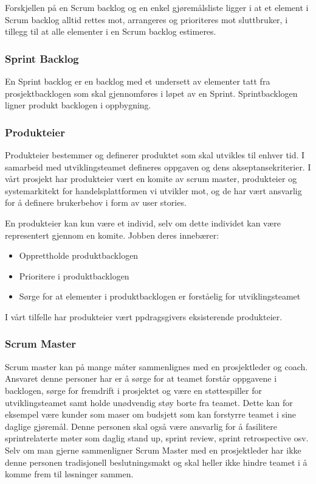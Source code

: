 Forskjellen på en Scrum backlog og en enkel gjøremålsliste ligger i at et element i Scrum backlog alltid rettes mot, arrangeres og prioriteres mot sluttbruker, i tillegg til at alle elementer i en Scrum backlog estimeres. 


\subsubsection{\textbf{Sprint Backlog}}
En Sprint backlog er en backlog med et undersett av elementer tatt fra prosjektbacklogen som skal gjennomføres i løpet av en Sprint. Sprintbacklogen ligner produkt backlogen i oppbygning.

\subsubsection{\textbf{Produkteier}}
Produkteier bestemmer og definerer produktet som skal utvikles til enhver tid. I samarbeid med utviklingsteamet defineres oppgaven og dens akseptansekriterier. I vårt prosjekt har produkteier vært en komite av scrum master, produkteier og systemarkitekt for handelsplattformen vi utvikler mot, og de har vært ansvarlig for å definere brukerbehov i form av user stories.

En produkteier kan kun være et individ, selv om dette individet kan være representert gjennom en komite. Jobben deres innebærer:
\begin{itemize}
    \item Opprettholde produktbacklogen
    \item Prioritere i produktbacklogen
    \item Sørge for at elementer i produktbacklogen er forståelig for utviklingsteamet
\end{itemize}

I vårt tilfelle har produkteier vært ppdragsgivers eksisterende produkteier.

\subsubsection{\textbf{Scrum Master}}
Scrum master kan på mange måter sammenlignes med en prosjektleder og coach. Ansvaret denne personer har er å sørge for at teamet forstår oppgavene i backlogen, sørge for fremdrift i prosjektet og være en støttespiller for utviklingsteamet samt holde unødvendig støy borte fra teamet. Dette kan for eksempel være kunder som maser om budsjett som kan forstyrre teamet i sine daglige  gjøremål. Denne personen skal også være ansvarlig for å fasilitere sprintrelaterte møter som daglig stand up, sprint review, sprint retrospective osv. Selv om man gjerne sammenligner Scrum Master med en prosjektleder har ikke denne personen tradisjonell beslutningsmakt og skal heller ikke hindre teamet i å komme frem til løsninger sammen.

